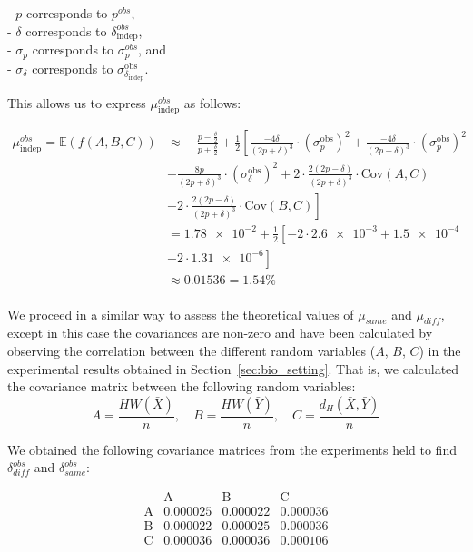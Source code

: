 - \(p\) corresponds to \(p^{obs}\),\\
- \(\delta\) corresponds to \(\delta_{\text{indep}}^{obs}\),\\
- \(\sigma_p\) corresponds to \(\sigma_p^{obs}\), and\\
- \(\sigma_\delta\) corresponds to \(\sigma_{\delta_{\text{indep}}}^{\text{obs}}\).

This allows us to express \( \mu_{\text{indep}}^{obs} \) as follows:

\begin{equation}
    \begin{aligned}
    \mu_{\text{indep}}^{obs} = \mathbb{E}(f(A,B,C)) &\approx \quad \frac{p - \frac{\delta}{2}}{p + \frac{\delta}{2}} + \frac{1}{2} \left[ \frac{-4\delta}{(2p + \delta)^3}\cdot({\sigma^\text{obs}_p})^2 + \frac{-4\delta}{(2p + \delta)^3}\cdot({\sigma^\text{obs}_p})^2 \right. \\[2mm]
    & \left. + \frac{8p}{(2p + \delta)^3}\cdot({\sigma^\text{obs}_\delta})^2 + 2\cdot\frac{2(2p - \delta)}{(2p + \delta)^3}\cdot\text{Cov}(A,C) \right. \\[2mm]
    & \left. + 2\cdot\frac{2(2p - \delta)}{(2p + \delta)^3}\cdot\text{Cov}(B,C) \right]\\[6mm]
    & = \num{1.78e-2} + \frac{1}{2} \left[ -2\cdot\num{2.6e-3} + \num{1.5e-4}  \right. \\[2mm]
    & \left. + 2\cdot\num{1.31e-6} \right] \\[6mm]
    & \approx 0.01536 = 1.54\%
    \end{aligned}
    \label{eq:mu_indep}
\end{equation}\\

We proceed in a similar way to assess the theoretical values of $\mu_{same}$ and $\mu_{diff}$, except in this case the covariances are non-zero and have been calculated by observing the correlation between the different random variables (\(A\), \(B\), \(C\)) in the experimental results obtained in Section~\ref{sec:bio_setting}. That is, we calculated the covariance matrix between the following random variables:
\[
A = \frac{HW(\bar{X})}{n}, \quad B = \frac{HW(\bar{Y})}{n}, \quad C = \frac{d_H(\bar{X}, \bar{Y})}{n}
\]

We obtained the following covariance matrices from the experiments held to find \(\delta^{obs}_{diff}\) and \(\delta^{obs}_{same}\):

\[
\begin{array}{c|ccc}
           & \text{A} & \text{B} & \text{C} \\
\hline
\text{A} & 0.000025 & 0.000022 & 0.000036 \\
\text{B} & 0.000022 & 0.000025 & 0.000036 \\
\text{C} & 0.000036 & 0.000036 & 0.000106 \\
\end{array}
\]
\begin{center}\end{center}


